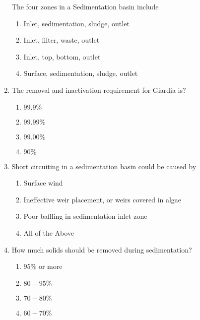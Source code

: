 \begin{enumerate}
The four zones in a Sedimentation basin include\\
\begin{enumerate}
\item Inlet, sedimentation, sludge, outlet\\
\item Inlet, filter, waste, outlet\\
\item Inlet, top, bottom, outlet\\
\item Surface, sedimentation, sludge, outlet
\end{enumerate}

\item The removal and inactivation requirement for Giardia is?\\
\begin{enumerate}
\item $99.9 \%$\\
\item $99.99 \%$\\
\item $99.00 \%$\\
\item $90 \%$
\end{enumerate}

\item Short circuiting in a sedimentation basin could be caused by\\
\begin{enumerate}
\item Surface wind\\
\item Ineffective weir placement, or weirs covered in algae\\
\item Poor baffling in sedimentation inlet zone\\
\item All of the Above
\end{enumerate}

\item How much solids should be removed during sedimentation?\\
\begin{enumerate}
\item $95 \%$ or more\\
\item $80-95 \%$\\
\item $70-80 \%$\\
\item $60-70 \%$
\end{enumerate}


\end{enumerate}
